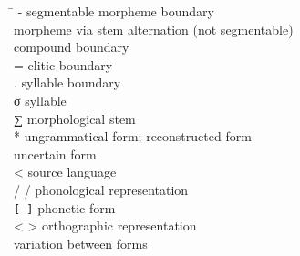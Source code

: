 %


\label{abbreviations}

\newcommand{\TABh}{\hspace{40pt}}%

\begin{tabbing}
\TABh \= \kill
-		\> segmentable morpheme boundary \\
\BS		\> morpheme via stem alternation (not segmentable) \\
\PLUS	\> compound boundary \\%
=		\> clitic boundary \\
.		\> syllable boundary\\
σ		\> syllable \\
∑		\> morphological stem \\
*		\> ungrammatical form; reconstructed form \\%
\QUES	\> uncertain form \\
<		\> source language \\
/ /		\> phonological representation\\
\verb|[ ]|	\> phonetic form\\%
< >		\> orthographic representation\\
\TILDE	\> variation between forms \\
\end{tabbing}

